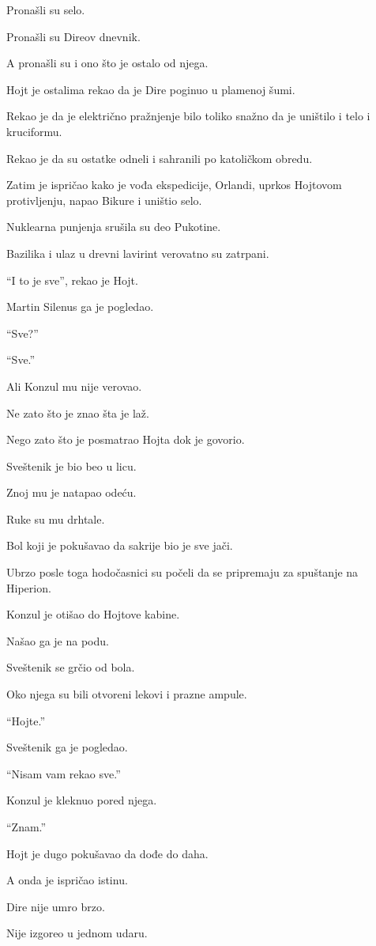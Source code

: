Pronašli su selo.

Pronašli su Direov dnevnik.

A pronašli su i ono što je ostalo od njega.

Hojt je ostalima rekao da je Dire poginuo u plamenoj šumi.

Rekao je da je električno pražnjenje bilo toliko snažno da je uništilo i telo i kruciformu.

Rekao je da su ostatke odneli i sahranili po katoličkom obredu.

Zatim je ispričao kako je vođa ekspedicije, Orlandi, uprkos Hojtovom protivljenju, napao Bikure i uništio selo.

Nuklearna punjenja srušila su deo Pukotine.

Bazilika i ulaz u drevni lavirint verovatno su zatrpani.

``I to je sve'', rekao je Hojt.

Martin Silenus ga je pogledao.

``Sve?''

``Sve.''

Ali Konzul mu nije verovao.

Ne zato što je znao šta je laž.

Nego zato što je posmatrao Hojta dok je govorio.

Sveštenik je bio beo u licu.

Znoj mu je natapao odeću.

Ruke su mu drhtale.

Bol koji je pokušavao da sakrije bio je sve jači.

Ubrzo posle toga hodočasnici su počeli da se pripremaju za spuštanje na Hiperion.

Konzul je otišao do Hojtove kabine.

Našao ga je na podu.

Sveštenik se grčio od bola.

Oko njega su bili otvoreni lekovi i prazne ampule.

``Hojte.''

Sveštenik ga je pogledao.

``Nisam vam rekao sve.''

Konzul je kleknuo pored njega.

``Znam.''

Hojt je dugo pokušavao da dođe do daha.

A onda je ispričao istinu.

Dire nije umro brzo.

Nije izgoreo u jednom udaru.

